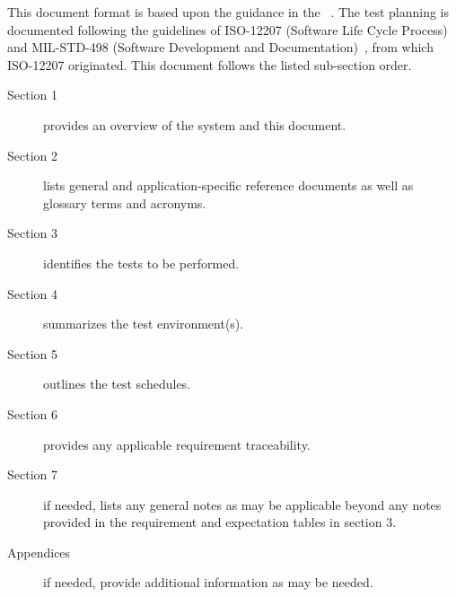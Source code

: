 This document format is based upon the guidance in the \STP \DID~\cite{ref__STP_DID}.
The test planning is documented following the guidelines of ISO-12207 (Software Life Cycle Process)~\cite{ref__ISO_12207} and MIL-STD-498 (Software Development and Documentation)~\cite{ref__MIL_STD_498}, from which ISO-12207 originated.
This document follows the listed \STP sub-section order.
\begin{description}
	\item[Section 1] provides an overview of the system and this document.
	\item[Section 2] lists general and application-specific reference documents as well as glossary terms and acronyms. 
	\item[Section 3] identifies the tests to be performed. 
	\item[Section 4] summarizes the test environment(s).
  \item[Section 5] outlines the test schedules.
	\item[Section 6] provides any applicable requirement traceability.
	\item[Section 7] if needed, lists any general notes as may be applicable beyond any notes provided in the requirement and expectation tables in section 3.
	\item[Appendices] if needed, provide additional information as may be needed.
\end{description}